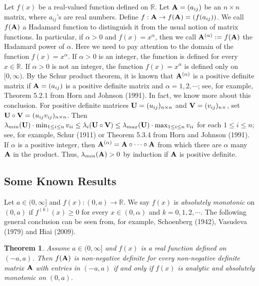 \documentclass[conference,letterpaper]{IEEEtran}
\numberwithin{equation}{section}
\newcommand{\lbl}{\label}
\newcommand{\bd}{\bold}
\newtheorem{theorem}{{\sc Theorem}}[section]
\begin{document}
Let $f(x)$ be a real-valued function defined on $\mathbb{R}.$ Let $\bd{A}=(a_{ij})$ be an $n\times n$ matrix, where $a_{ij}$'s are real numbers.  Define $f: \bd{A} \rightarrow f(\bd{A)}=(f(a_{i j}))$. We call $f(\bd{A})$  a Hadamard function to distinguish it from the usual notion of matrix functions. In particular, if $\alpha>0$ and  $f(x)=x^{\alpha}$, then we call  $\bd{A}^{(\alpha)}:=f(\bd{A})$ the Hadamard power of $\alpha$. Here we need to pay attention to the domain of the function $f(x)=x^{\alpha}$. If $\alpha>0$ is an integer, the function is defined for every $x\in \mathbb{R}.$ If $\alpha>0$ is not an integer, the function $f(x)=x^{\alpha}$ is defined only on $[0, \infty).$ By the Schur product theorem, it is known that $\bd{A}^{(\alpha)}$ is a positive definite matrix if $\bd{A}=(a_{ij})$ is a positive definite matrix and $\alpha =1,2, \cdots$; see, for example, Theorem 5.2.1 from Horn and Johnson (1991). In fact, we know more about this conclusion. For positive definite matrices $\bd{U}=(u_{ij})_{n\times n}$ and $\bd{V}=(v_{ij})_{n\times}$, set $\bd{U}\circ \bd{V}=(u_{ij}v_{ij})_{n\times n}$. Then  $\lambda_{min}(\bd{U})\cdot\min_{1\leq i \leq n}{v_{ii}}\leq \lambda_i(\bd{U}\circ \bd{V})\leq \lambda_{max}(\bd{U})\cdot\max_{1\leq i \leq n}{v_{ii}}$ for each $1\leq i \leq n$; see, for example, Schur (1911) or Theorem 5.3.4 from Horn and Johnson (1991). If $\alpha$ is a positive integer, then  $\bd{A}^{(\alpha)}=\bd{A}\circ\cdots\circ\bd{A}$ from which there are $\alpha$ many $\bd{A}$ in the product. Thus, $\lambda_{min}(\bd{A})>0$ by induction  if $\bd{A}$ is positive definite.

\subsection{Some Known Results}\lbl{known_results}

 Let $a \in (0, \infty]$ and $f(x): (0, a)\to \mathbb{R}$. We say $f(x)$ is {\it absolutely monotonic} on  $(0, a)$ if $f^{(k)}(x)\geq 0$ for every $x\in (0, \alpha)$ and $k=0,1,2, \cdots.$ The following general conclusion can be seen from, for example,   Schoenberg (1942),  Vasudeva (1979) and Hiai (2009).

\begin{theorem} Assume $a \in (0, \infty]$ and $f(x)$ is a real function defined on $(-a, a)$.  Then $f(\bd{A})$ is non-negative definite for  every  non-negative definite matrix  $\bd{A}$ with  entries  in $(-a, a)$ if  and  only  if $f(x)$ is  analytic  and absolutely monotonic on $(0, a).$
\end{theorem}
\end{document}
